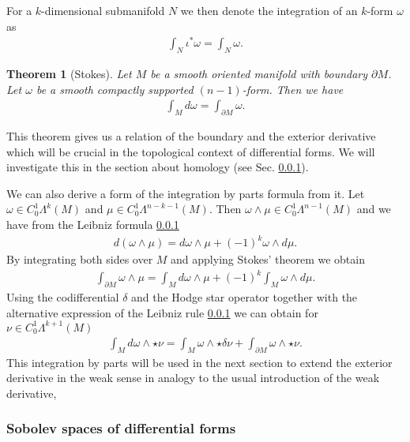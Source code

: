 \documentclass[12pt,a4paper]{article}
\numberwithin{equation}{subsection}
\numberwithin{lemma}{subsection}
\newtheorem{theorem}[lemma]{Theorem}
\theoremstyle{definition}
\begin{document}
For a $k$-dimensional submanifold $N$ we then denote the integration of an 
$k$-form $\omega$ as
\begin{align*}
    \int_N \iota^*\omega = \int_N \omega.
\end{align*} 

\begin{theorem}[Stokes]
    Let $M$ be a smooth oriented manifold with boundary 
    $\partial M$. Let $\omega$ be 
    a smooth compactly supported $(n-1)$-form. Then we have 
    \begin{align*}
        \int_M d\omega = \int_{\partial M} \omega.
    \end{align*}
\end{theorem}
This theorem gives us a relation of the boundary and the exterior derivative 
which will be crucial in the topological context of differential forms.
We will investigate this in the section about homology (see Sec. \ref{}). 

We can also derive a form of the integration by parts formula from it. 
Let $\omega \in C_0^1 \Lambda^k (M)$ and $\mu \in C_0^1 \Lambda^{n-k-1}(M)$. 
Then $\omega \wedge \mu \in C_0^1 \Lambda^{n-1} (M)$ and we have from 
the Leibniz formula \ref{} 
\begin{align*}
    d(\omega \wedge \mu) = d\omega \wedge \mu + (-1)^k \omega \wedge d\mu. 
\end{align*}
By integrating both sides over $M$ and applying Stokes' theorem we obtain
\begin{align*}
    \int_{\partial M} \omega \wedge \mu 
    = \int_M d\omega \wedge \mu + (-1)^k \int_M \omega \wedge d\mu.
\end{align*}
Using the codifferential $\delta$ and the Hodge star operator together 
with the alternative expression of the Leibniz rule \ref{}
we can obtain for $\nu \in C^1_0 \Lambda^{k+1} (M)$
\begin{align*}
    \int_M d\omega \wedge \star \nu 
    = \int_M \omega \wedge \star \delta \nu  
        + \int_{\partial M} \omega \wedge \star \nu.
\end{align*}
This integration by parts will be used in the next section to extend the 
exterior derivative in the weak sense in analogy to the usual introduction 
of the weak derivative,

\subsubsection{Sobolev spaces of differential forms}
\end{document}
